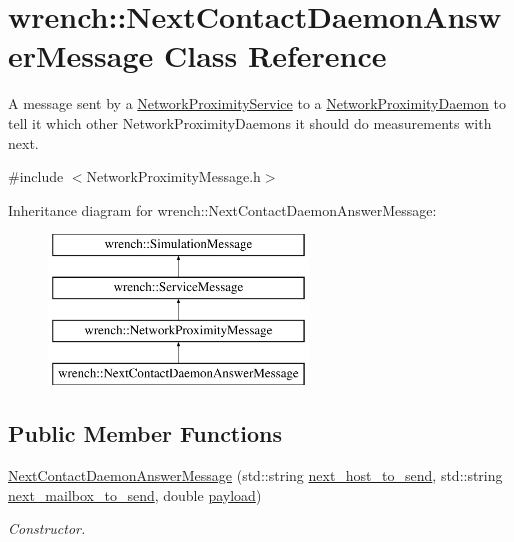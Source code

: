 \hypertarget{classwrench_1_1_next_contact_daemon_answer_message}{}\section{wrench\+:\+:Next\+Contact\+Daemon\+Answer\+Message Class Reference}
\label{classwrench_1_1_next_contact_daemon_answer_message}


A message sent by a \hyperlink{classwrench_1_1_network_proximity_service}{Network\+Proximity\+Service} to a \hyperlink{classwrench_1_1_network_proximity_daemon}{Network\+Proximity\+Daemon} to tell it which other Network\+Proximity\+Daemons it should do measurements with next.  




{\ttfamily \#include $<$Network\+Proximity\+Message.\+h$>$}

Inheritance diagram for wrench\+:\+:Next\+Contact\+Daemon\+Answer\+Message\+:\begin{figure}[H]
\begin{center}
\leavevmode
\includegraphics[height=4.000000cm]{classwrench_1_1_next_contact_daemon_answer_message}
\end{center}
\end{figure}
\subsection*{Public Member Functions}
\begin{DoxyCompactItemize}
\item 
\hyperlink{classwrench_1_1_next_contact_daemon_answer_message_af2f82e308f4390218217184b18bb83dc}{Next\+Contact\+Daemon\+Answer\+Message} (std\+::string \hyperlink{classwrench_1_1_next_contact_daemon_answer_message_a7fb569a3d840c5f2df40bc6c9bda6c1d}{next\+\_\+host\+\_\+to\+\_\+send}, std\+::string \hyperlink{classwrench_1_1_next_contact_daemon_answer_message_a95be68ada26066126f8a7f8c428c7f08}{next\+\_\+mailbox\+\_\+to\+\_\+send}, double \hyperlink{classwrench_1_1_simulation_message_a914f2732713f7c02898e66f05a7cb8a1}{payload})
\begin{DoxyCompactList}\small\item\em Constructor. \end{DoxyCompactList}\end{DoxyCompactItemize}
